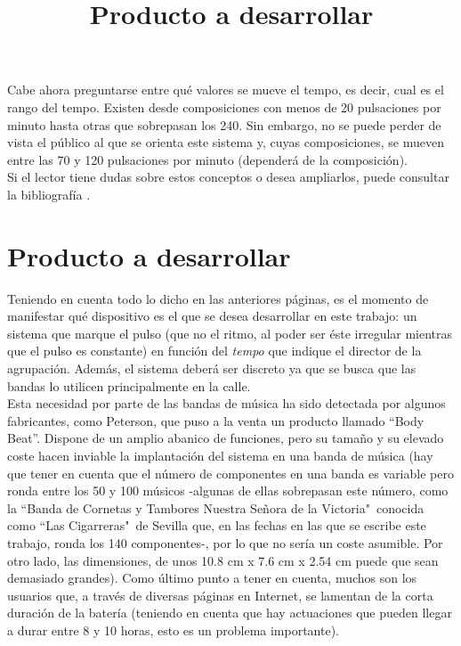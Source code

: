 Cabe ahora preguntarse entre qué valores se mueve el tempo, es decir, cual es el rango
del tempo. Existen desde composiciones con menos de 20 pulsaciones por minuto hasta
otras que sobrepasan los 240. Sin embargo, no se puede perder de vista
el público al que se orienta este sistema y, cuyas composiciones, se mueven entre las 70 y 120 pulsaciones
por minuto (dependerá de la composición).\\

Si el lector tiene dudas sobre estos conceptos o desea ampliarlos, puede consultar
la bibliografía \cite{teorMusica} \cite{lenguajeMusical}.\\


\title{Producto a desarrollar}
\section{Producto a desarrollar}

Teniendo en cuenta todo lo dicho en las anteriores páginas, es el momento de manifestar
qué dispositivo es el que se desea desarrollar en este trabajo: un sistema que marque el
pulso (que no el ritmo, al poder ser éste irregular mientras que el pulso es constante)
en función del \textit{tempo} que indique el director de la agrupación. Además, el sistema deberá
ser discreto ya que se busca que las bandas lo utilicen principalmente en la calle.\\

Esta necesidad por parte de las bandas de música ha sido detectada por algunos fabricantes,
como Peterson, que puso a la venta un producto llamado “Body Beat”. Dispone de un amplio
abanico de funciones, pero su tamaño y su elevado coste hacen inviable la implantación del
sistema en una banda de música (hay que tener en cuenta que el número de componentes en una
banda es variable pero ronda entre los 50 y 100 músicos -algunas de ellas sobrepasan este número,
como la ``Banda de Cornetas y Tambores Nuestra Señora de la Victoria"\ conocida como ``Las Cigarreras"\
de Sevilla \cite{cigarreras} que, en las fechas en las que se escribe este trabajo, ronda los 140 componentes-,
por lo que no sería un coste asumible. Por otro lado, las dimensiones, de unos 10.8 cm x 7.6 cm x 2.54 cm puede
que sean demasiado grandes).
Como último punto a tener en cuenta, muchos son los usuarios que, a través de diversas páginas en Internet,
se lamentan de la corta duración de la batería (teniendo en cuenta que hay actuaciones que pueden llegar a
durar entre 8 y 10 horas, esto es un problema importante).\\


